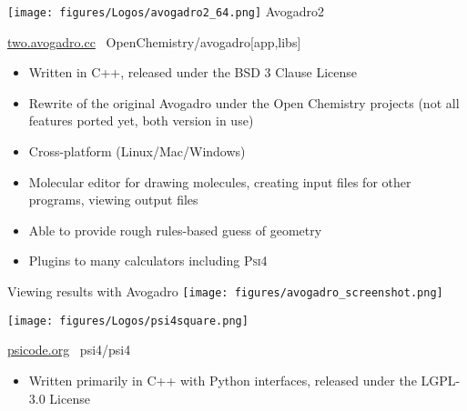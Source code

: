 \begin{frame}{
 \hspace{-5mm}
 \texttt{[image: figures/Logos/avogadro2\_64.png]}
 Avogadro2
}

\url{two.avogadro.cc}
\hspace{10mm}
\ghinlinelogo\ OpenChemistry/avogadro[app,libs]

\vspace{5mm}

 \begin{itemize}
 \item Written in C++, released under the BSD 3 Clause License
 \item Rewrite of the original Avogadro under the Open Chemistry projects (not all features ported yet, both version in use)
 \item Cross-platform (Linux/Mac/Windows)
 \item Molecular editor for drawing molecules, creating input files for other programs, viewing output files
 \item Able to provide rough rules-based guess of geometry
 \item Plugins to many calculators including \textsc{Psi4}
\end{itemize}
\end{frame}

\begin{frame}{Viewing results with Avogadro}
\vspace{-5mm}
\centering
 \texttt{[image: figures/avogadro\_screenshot.png]}
\end{frame}


\begin{frame}{
 \hspace{-5mm}
 \texttt{[image: figures/Logos/psi4square.png]}
}

\url{psicode.org}
\hspace{10mm}
\ghinlinelogo\ psi4/psi4

\vspace{5mm}

\begin{itemize}
 \item Written primarily in C++ with Python interfaces, released under the LGPL-3.0 License
\end{itemize}
\end{frame}

